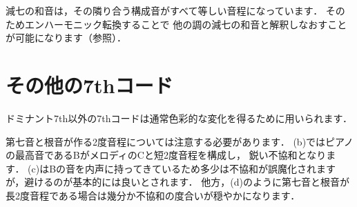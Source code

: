 \documentclass[dvipdfmx,uplatex,b5paper,openany,jbase=12Q,nomag*,textwidth-limit=44%
               ]{gachimuchi}
\begin{document}
減七の和音は，その隣り合う構成音がすべて等しい音程になっています．
そのためエンハーモニック転換することで
他の調の減七の和音と解釈しなおすことが可能になります（参照）．



\section{その他の7thコード}
ドミナント7th以外の7thコードは通常色彩的な変化を得るために用いられます．

第七音と根音が作る2度音程については注意する必要があります．
(b)ではピアノの最高音であるBがメロディのCと短2度音程を構成し，
鋭い不協和となります．
(c)はBの音を内声に持ってきているため多少は不協和が誤魔化されますが，避けるのが基本的には良いとされます．
他方，(d)のように第七音と根音が長2度音程である場合は幾分か不協和の度合いが穏やかになります．
\end{document}
